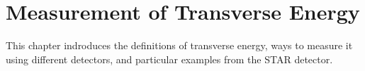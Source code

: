 \chapter{Measurement of Transverse Energy} \label{ch:measurement}




This chapter indroduces the definitions of transverse energy, ways to measure it using different detectors, and particular examples from the STAR detector.

